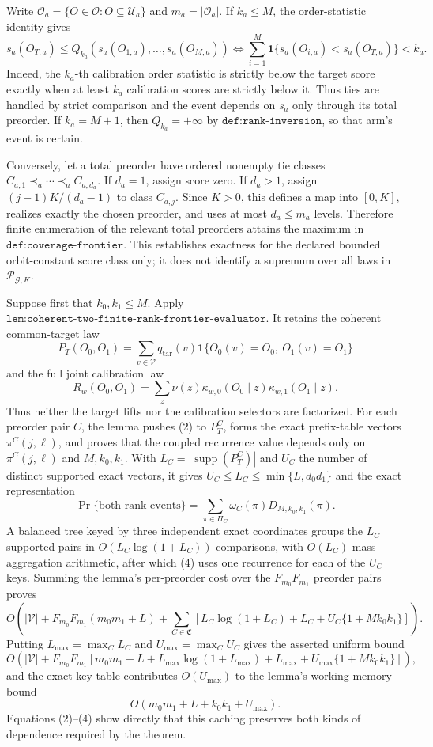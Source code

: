Write \(\mathcal O_a=\{O\in\mathcal O:O\subseteq\mathcal U_a\}\) and \(m_a=|\mathcal O_a|\). If \(k_a\le M\), the order-statistic identity gives
\[
s_a(O_{T,a})\le Q_{k_a}(s_a(O_{1,a}),\ldots,s_a(O_{M,a}))
\Longleftrightarrow
\sum_{i=1}^M\mathbf 1\{s_a(O_{i,a})<s_a(O_{T,a})\}<k_a.\tag{1}
\]
Indeed, the \(k_a\)-th calibration order statistic is strictly below the target score exactly when at least \(k_a\) calibration scores are strictly below it. Thus ties are handled by strict comparison and the event depends on \(s_a\) only through its total preorder. If \(k_a=M+1\), then \(Q_{k_a}=+\infty\) by \(\texttt{def:rank-inversion}\), so that arm's event is certain.

Conversely, let a total preorder have ordered nonempty tie classes \(C_{a,1}\prec_a\cdots\prec_a C_{a,d_a}\). If \(d_a=1\), assign score zero. If \(d_a>1\), assign \((j-1)K/(d_a-1)\) to class \(C_{a,j}\). Since \(K>0\), this defines a map into \([0,K]\), realizes exactly the chosen preorder, and uses at most \(d_a\le m_a\) levels. Therefore finite enumeration of the relevant total preorders attains the maximum in \(\texttt{def:coverage-frontier}\). This establishes exactness for the declared bounded orbit-constant score class only; it does not identify a supremum over all laws in \(\mathcal P_{\mathcal G,K}\).

Suppose first that \(k_0,k_1\le M\). Apply \(\texttt{lem:coherent-two-finite-rank-frontier-evaluator}\). It retains the coherent common-target law
\[
P_T(O_0,O_1)=\sum_{v\in\mathcal V}q_{\mathrm{tar}}(v)\mathbf 1\{O_0(v)=O_0,\ O_1(v)=O_1\}\tag{2}
\]
and the full joint calibration law
\[
R_w(O_0,O_1)=\sum_z\nu(z)\kappa_{w,0}(O_0\mid z)\kappa_{w,1}(O_1\mid z).\tag{3}
\]
Thus neither the target lifts nor the calibration selectors are factorized. For each preorder pair \(C\), the lemma pushes (2) to \(P_T^C\), forms the exact prefix-table vectors \(\pi^C(j,\ell)\), and proves that the coupled recurrence value depends only on \(\pi^C(j,\ell)\) and \(M,k_0,k_1\). With \(L_C=|\operatorname{supp}(P_T^C)|\) and \(U_C\) the number of distinct supported exact vectors, it gives \(U_C\le L_C\le\min\{L,d_0d_1\}\) and the exact representation
\[
\Pr\{\text{both rank events}\}=\sum_{\pi\in\Pi_C}\omega_C(\pi)D_{M,k_0,k_1}(\pi).\tag{4}
\]
A balanced tree keyed by three independent exact coordinates groups the \(L_C\) supported pairs in \(O(L_C\log(1+L_C))\) comparisons, with \(O(L_C)\) mass-aggregation arithmetic, after which (4) uses one recurrence for each of the \(U_C\) keys. Summing the lemma's per-preorder cost over the \(F_{m_0}F_{m_1}\) preorder pairs proves
\[
O\!\left(
|\mathcal V|+F_{m_0}F_{m_1}(m_0m_1+L)+\sum_{C\in\mathfrak C}\left[L_C\log(1+L_C)+L_C+U_C\{1+Mk_0k_1\}\right]
\right).\tag{5}
\]
Putting \(L_{\max}=\max_C L_C\) and \(U_{\max}=\max_C U_C\) gives the asserted uniform bound
\[
O\!\left(|\mathcal V|+F_{m_0}F_{m_1}\left[m_0m_1+L+L_{\max}\log(1+L_{\max})+L_{\max}+U_{\max}\{1+Mk_0k_1\}\right]\right),\tag{6}
\]
and the exact-key table contributes \(O(U_{\max})\) to the lemma's working-memory bound
\[
O(m_0m_1+L+k_0k_1+U_{\max}).\tag{7}
\]
Equations (2)--(4) show directly that this caching preserves both kinds of dependence required by the theorem.

